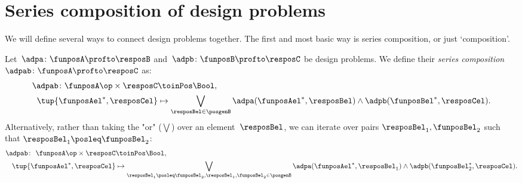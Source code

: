 
\section[Series composition]{Series composition of design problems}
We will define several ways to connect design problems together. The first and most basic way is series composition, or just `composition'.



\begin{definition}
    \label{def:dp-series}
    Let~$\adpa \colon  \funposA \profto \resposB$ and~$\adpb \colon \funposB \profto \resposC$ be design problems.
    We define their \emph{series composition}~$\adpab \colon  \funposA \profto \resposC$ as:
    \begin{equation}
        \label{eq:composition2}
        \begin{aligned}
            \adpab
            \colon \funposA\op \times \resposC & \toinPos  \Bool, \\
            \tup{\funposAel^*, \resposCel} &\mapsto \bigvee_{\resposBel \in \posgenB} \adpa(\funposAel^*,\resposBel) \wedge \adpb(\funposBel^*,\resposCel).
        \end{aligned}
    \end{equation}
    Alternatively, rather than taking the "or" ($\bigvee$) over an element~$\resposBel$, we
    can iterate over pairs  $\resposBel_1,\funposBel_2$ such that $\resposBel_1\posleq\funposBel_2$:
    \begin{equation}
        \begin{aligned}
            \label{eq:composition}
            \adpab  \colon \ \funposA\op \times \resposC & \toinPos  \Bool,  \\
            \tup{\funposAel^*, \resposCel} &\mapsto \bigvee_{\resposBel_1\posleq\funposBel_2, \resposBel_1,\funposBel_2\in \posgenB} \adpa(\funposAel^*,\resposBel_1) \wedge \adpb(\funposBel_2^*,\resposCel).
        \end{aligned}
    \end{equation}
\end{definition}


